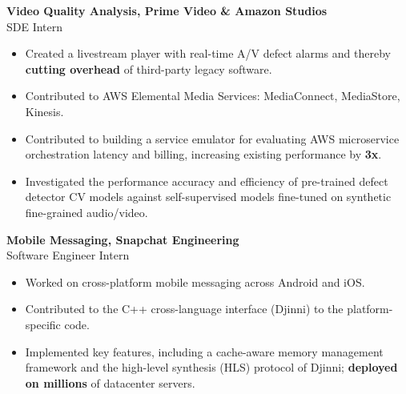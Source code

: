 \documentclass[11pt,a4paper]{article}
\newcommand{\years}[1]{\marginnote{\footnotesize\myfont #1}} %
\begin{document}
    \years{2021-21} \textbf{Video Quality Analysis, Prime Video \& Amazon Studios} \\
    SDE Intern \vspace{1pt}
    \begin{itemize}[itemsep=-1mm,topsep=0pt,partopsep=0pt,leftmargin=5mm]
     \item Created a livestream player with real-time A/V defect alarms and thereby \textbf{cutting overhead} of third-party legacy software.
     \item Contributed to AWS Elemental Media Services: MediaConnect, MediaStore, Kinesis.
     \item Contributed to building a service emulator for evaluating AWS microservice orchestration latency and billing, increasing existing performance by \textbf{3x}.
     \item Investigated the performance accuracy and efficiency of pre-trained defect detector CV models against self-supervised models fine-tuned on synthetic fine-grained audio/video.\medskip
    \end{itemize}
    \years{2020-2020} \textbf{Mobile Messaging, Snapchat Engineering} \\
    Software Engineer Intern \vspace{1pt}
    \begin{itemize}[itemsep=-1mm,topsep=0pt,partopsep=0pt,leftmargin=5mm]
     \item Worked on cross-platform mobile messaging across Android and iOS.
     \item Contributed to the C++ cross-language interface (Djinni) to the platform-specific code.
     \item Implemented key features, including a cache-aware memory management framework and the high-level synthesis (HLS) protocol of Djinni; \textbf{deployed on millions} of datacenter servers.
    \end{itemize}
\end{document}
